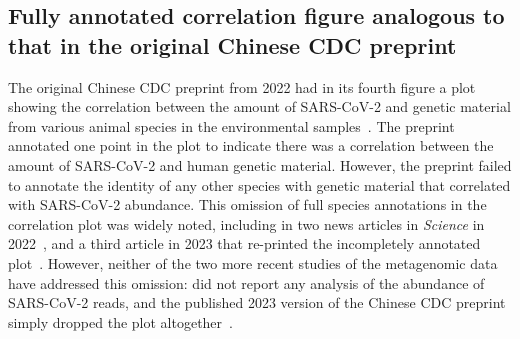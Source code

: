 \documentclass[9pt,twocolumn,twoside]{gsajnl_modified}
\begin{document}
\subsection{Fully annotated correlation figure analogous to that in the original Chinese CDC preprint}
The original Chinese CDC preprint from 2022 had in its fourth figure a plot showing the correlation between the amount of SARS-CoV-2 and genetic material from various animal species in the environmental samples~\citep{liu2022surveillance}.
The preprint annotated one point in the plot to indicate there was a correlation between the amount of SARS-CoV-2 and human genetic material.
However, the preprint failed to annotate the identity of any other species with genetic material that correlated with SARS-CoV-2 abundance.
This omission of full species annotations in the correlation plot was widely noted, including in two news articles in \textit{Science} in 2022~\citep{cohen2022anywhere,cohen2022studies}, and a third article in 2023 that re-printed the incompletely annotated plot~\citep{cohen2023unearthed}.
However, neither of the two more recent studies of the metagenomic data have addressed this omission: \citet{crits2023genetic} did not report any analysis of the abundance of SARS-CoV-2 reads, and the published 2023 version of the Chinese CDC preprint simply dropped the plot altogether~\citep{liu2023surveillance}.
\end{document}
